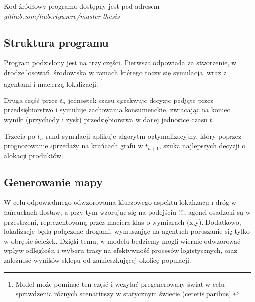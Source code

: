 \documentclass{article}
\begin{document}
Kod źródłowy programu dostępny jest pod adresem  \textit{github.com/hubertguzera/master-thesis}

\subsection{Struktura programu}

Program podzielony jest na trzy części. Pierwsza odpowiada za stworzenie, w drodze losowań, środowiska w ramach którego toczy się symulacja, wraz z agentami i macierzą lokalizacji. \footnote{Model może pominąć ten część i wczytać pregenerowany świat w celu sprawdzenia różnych scenariuszy w statycznym świecie (ceteris paribus).}

 Druga część przez $t_n$ jednostek czasu egzekwuje decyzje podjęte przez przedsiębiorstwo i symuluje zachowania konsumenckie, zwracając na koniec wyniki (przychody i zysk) przedsiębiorstwa w danej jednostce czasu $t$.

Trzecia po $t_n$ rund symulacji aplikuje algorytm optymalizacyjny, który poprzez prognozowanie sprzedaży na krańcach grafu w $t_{n+1}$, szuka najlepszych decyzji o alokacji produktów.

\begin{center}

\end{center}

\subsection{Generowanie mapy}

W celu odpowiedniego odwzorowania kluczowego aspektu lokalizacji i dróg w łańcuchach dostaw, a przy tym wzorując się na podejściu !!!, agenci osadzoni są w przestrzeni, reprezentowaną przez macierz klas o wymiarach (x,y). Dodatkowo, lokalizacje będą połączone drogami, wymusząjąc na agentach poruszanie się tylko w obrębie ścieżek. Dzięki temu, w modelu będziemy mogli wiernie odwzorować wpływ odległości i wyboru trasy na efektywność procesów logistycznych, oraz zależność wyników sklepu od zamieszkującej okolicę populacji.
\end{document}

